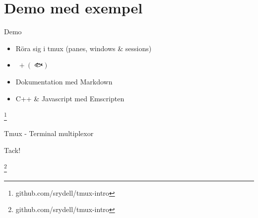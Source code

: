 \documentclass[10pt]{beamer}
\newcommand\blfootnote[1]{%
  \begingroup
  \renewcommand\thefootnote{}\footnote{#1}%
  \addtocounter{footnote}{-1}%
  \endgroup
}
\begin{document}
\section{Demo med exempel}

\begin{frame}{Demo}
     \begin{itemize}
         \item Röra sig i tmux (panes, windows \& sessions)
         \item $🐍 + (👶 🐟)$
         \item Dokumentation med Markdown
         \item C++ \& Javascript med Emscripten
     \end{itemize}
     \blfootnote{github.com/srydell/tmux-intro}
\end{frame}

\begin{frame}{Tmux - Terminal multiplexor}
     \begin{center}
         \large Tack!
     \end{center}
     \blfootnote{github.com/srydell/tmux-intro}
\end{frame}
\end{document}
